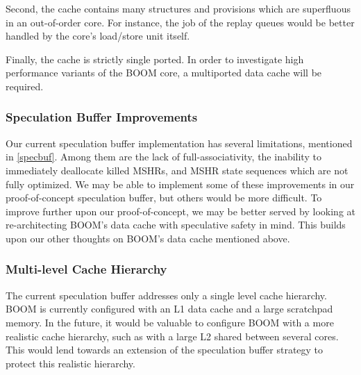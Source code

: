 Second, the cache contains many structures and provisions which are superfluous in an out-of-order core.
For instance, the job of the replay queues would be better handled by the core's load/store unit itself.

Finally, the cache is strictly single ported. In order to investigate high performance variants of the BOOM core,
a multiported data cache will be required.

\subsubsection{Speculation Buffer Improvements}
Our current speculation buffer implementation has several limitations, mentioned in \ref{specbuf}.
Among them are the lack of full-associativity, the inability to immediately deallocate killed MSHRs, and MSHR state sequences which are not fully optimized.
We may be able to implement some of these improvements in our proof-of-concept speculation buffer, but others would be more difficult. To improve further upon
our proof-of-concept, we may be better served by looking at re-architecting BOOM's data cache with speculative safety in mind. This builds upon our other thoughts
on BOOM's data cache mentioned above.

\subsubsection{Multi-level Cache Hierarchy}
The current speculation buffer addresses only a single level cache hierarchy.
BOOM is currently configured with an L1 data cache and a large scratchpad memory.
In the future, it would be valuable to configure BOOM with a more realistic cache hierarchy,
such as with a large L2 shared between several cores. This would lend towards an extension of the speculation
buffer strategy to protect this realistic hierarchy.
